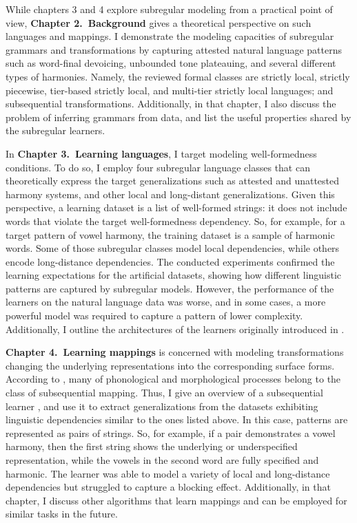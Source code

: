 While chapters 3 and 4 explore subregular modeling from a practical point of view, \textbf{Chapter 2.\ Background} gives a theoretical perspective on such languages and mappings.
I demonstrate the modeling capacities of subregular grammars and transformations by capturing attested natural language patterns such as word-final devoicing, unbounded tone plateauing, and several different types of harmonies.
Namely, the reviewed formal classes are strictly local, strictly piecewise, tier-based strictly local, and multi-tier strictly local languages; and subsequential transformations.
Additionally, in that chapter, I also discuss the problem of inferring grammars from data, and list the useful properties shared by the subregular learners.



In \textbf{Chapter 3.\ Learning languages}, I target modeling well-formedness conditions.
To do so, I employ four subregular language classes that can theoretically express the target generalizations such as attested and unattested harmony systems, and other local and long-distant generalizations.
Given this perspective, a learning dataset is a list of well-formed strings: it does not include words that violate the target well-formedness dependency.
So, for example, for a target pattern of vowel harmony, the training dataset is a sample of harmonic words.
Some of those subregular classes model local dependencies, while others encode long-distance dependencies.
The conducted experiments confirmed the learning expectations for the artificial datasets, showing how different linguistic patterns are captured by subregular models.
However, the performance of the learners on the natural language data was worse, and in some cases, a more powerful model was required to capture a pattern of lower complexity.
Additionally, I outline the architectures of the learners originally introduced in \citep{Heinz-2010-SEL,JardineMcMullin2017,McMullinAksenovaDeSanto2019}.


\textbf{Chapter 4.\ Learning mappings} is concerned with modeling transformations changing the underlying representations into the corresponding surface forms.
According to \cite{Chandlee2014}, many of phonological and morphological processes belong to the class of subsequential mapping.
Thus, I give an overview of a subsequential learner \citep{OncinaEtAl1993,DeLaHiguera2010}, and use it to extract generalizations from the datasets exhibiting linguistic dependencies similar to the ones listed above.
In this case, patterns are represented as pairs of strings.
So, for example, if a pair demonstrates a vowel harmony, then the first string shows the underlying or underspecified representation, while the vowels in the second word are fully specified and harmonic.
The learner was able to model a variety of local and long-distance dependencies but struggled to capture a blocking effect.
Additionally, in that chapter, I discuss other algorithms that learn mappings and can be employed for similar tasks in the future.


